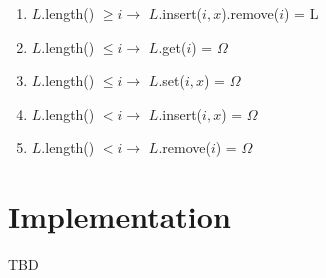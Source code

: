 \documentclass{article}
\begin{document}
\begin{enumerate}
\begin{enumerate}
		\item \(L\).length() \(\geq i \rightarrow\) \(L\).insert(\(i, x\)).remove(\(i\)) = L
		\item \(L\).length() \(\leq i \rightarrow\) \(L\).get(\(i\)) = \(\Omega\)
		\item \(L\).length() \(\leq i \rightarrow\) \(L\).set(\(i, x\)) = \(\Omega\)
		\item \(L\).length() \(< i \rightarrow\) \(L\).insert(\(i, x\)) = \(\Omega\)
		\item \(L\).length() \(< i \rightarrow\) \(L\).remove(\(i\)) = \(\Omega\)
	\end{enumerate}
\end{enumerate}


\section*{Implementation}
TBD
\end{document}
